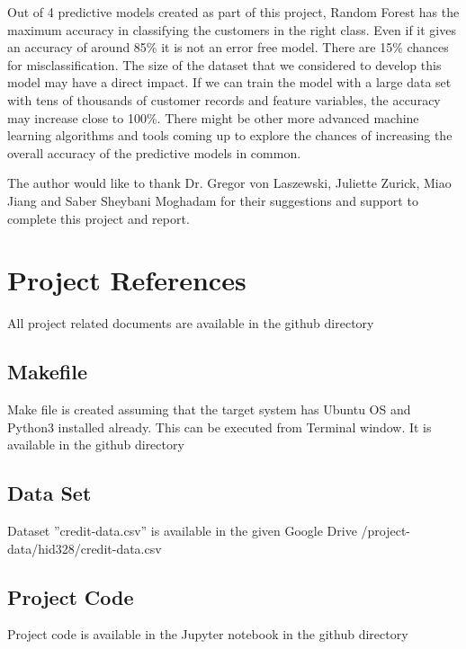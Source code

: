 \documentclass[sigconf]{acmart}
\begin{document}
Out of 4 predictive models created as part of this project, Random Forest has the maximum accuracy in classifying the customers in the right class. Even if it gives an accuracy of around 85\% it is not an error free model. There are 15\% chances for misclassification. The size of the dataset that we considered to develop this model may have a direct impact. If we can train the model with a large data set with tens of thousands of customer records and feature variables, the accuracy may increase close to 100\%. There might be other more advanced machine learning algorithms and tools coming up to explore the chances of increasing the overall accuracy of the predictive models in common.


\begin{acks}

The author would like to thank Dr. Gregor von Laszewski, Juliette Zurick, Miao Jiang and Saber Sheybani Moghadam for their suggestions and support to complete this project and report.

\end{acks}


 

\appendix

\section{Project References}

All project related documents are available in the github directory \cite{github}

\subsection{Makefile}\label{Makefile}

Make file is created assuming that the target system has Ubuntu OS and Python3 installed already. This can be executed from Terminal window. It is available in the github directory \cite{code}

\subsection{Data Set}

Dataset ''credit-data.csv'' is available in the given Google Drive /project-data/hid328/credit-data.csv 

\subsection{Project Code}\label{Project Code}

Project code is available in the Jupyter notebook in the github directory \cite{code}
\end{document}
